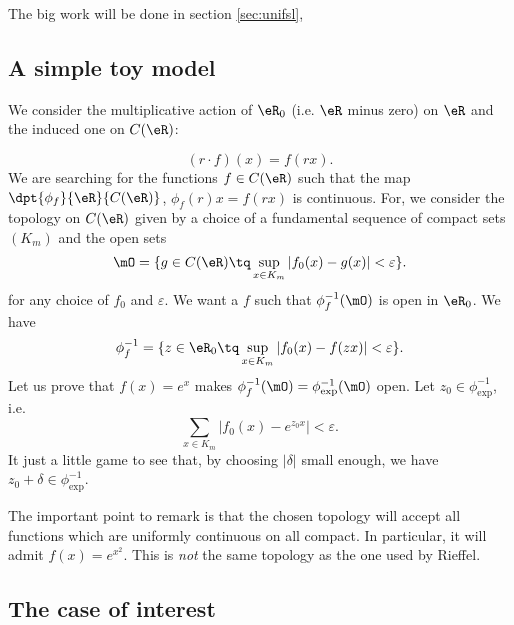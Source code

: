 The big work will be done in section \ref{sec:unifsl},

\subsection{A simple toy model}

We consider the multiplicative action of $\eR_0$ (i.e. $\eR$ minus zero) on $\eR$ and the induced one on $C(\eR)$:

\begin{equation}
(r\cdot f)(x)=f(rx).
\end{equation}
We are searching for the functions $f\in C(\eR)$ such that the map $\dpt{\phi_f}{\eR}{C(\eR)}$, $\phi_f(r)x=f(rx)$ is continuous. For, we consider the topology on $C(\eR)$ given by a choice of a fundamental sequence of compact sets $(K_m)$ and the open sets 
\[ 
  \mO=\{ g\in C(\eR)\tq \sup_{x\in K_m}| f_0(x)-g(x) |<\varepsilon \}.
\]
for any choice of $f_0$ and $\varepsilon$. We want a $f$ such that $\phi_f^{-1}(\mO)$ is open in $\eR_0$. We have
\begin{equation}
\phi^{-1}_f=\{ z\in\eR_0\tq \sup_{x\in K_m}| f_0(x)-f(zx) |<\varepsilon \}.
\end{equation}
Let us prove that $f(x)=e^x$ makes $\phi_f^{-1}(\mO)=\phi_{\exp}^{-1}(\mO)$ open. Let $z_0\in \phi^{-1}_{\exp}$, i.e.
\[ 
  \sum_{x\in K_m}| f_0(x)-e^{z_0x} |<\varepsilon.
\]
It just a little game to see that, by choosing $| \delta |$ small enough, we have $z_0+\delta\in\phi_{\exp}^{-1}$.
 
The important point to remark is that the chosen topology will accept all functions which are uniformly continuous on all compact. In particular, it will admit $f(x)=e^{x^2}$. This is \emph{not} the same topology as the one used by Rieffel.

\subsection{The case of interest}

